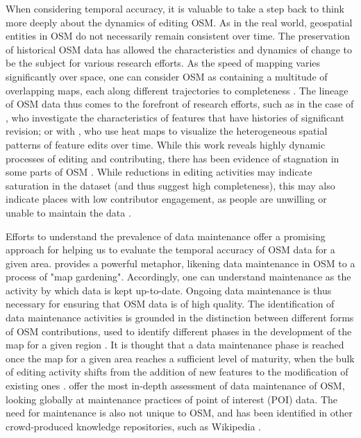 When considering temporal accuracy, it is valuable to take a step back to think more deeply about the dynamics of editing OSM. As in the real world, geospatial entities in OSM do not necessarily remain consistent over time. The preservation of historical OSM data has allowed the characteristics and dynamics of change to be the subject for various research efforts. As the speed of mapping varies significantly over space, one can consider OSM as containing a multitude of overlapping maps, each along different trajectories to completeness \parencite{chuang_one_2013}. The lineage of OSM data thus comes to the forefront of research efforts, such as in the case of \textcite{mooney_characteristics_2012}, who investigate the characteristics of features that have histories of significant revision; or with  \textcite{trame_exploring_2011}, who use heat maps to visualize the heterogeneous spatial patterns of feature edits over time. While this work reveals highly dynamic processes of editing and contributing, there has been evidence of stagnation in some parts of OSM \parencite{grochenig_digging_2014}. While reductions in editing activities may indicate saturation in the dataset (and thus suggest high completeness), this may also indicate places with low contributor engagement, as people are unwilling or unable to maintain the data \parencite{grochenig_digging_2014}.

Efforts to understand the prevalence of data maintenance offer a promising approach for helping us to evaluate the temporal accuracy of OSM data for a given area. \textcite{mcconchie_wiki_2013} provides a powerful metaphor, likening data maintenance in OSM to a process of "map gardening". Accordingly, one can understand maintenance as the activity by which data is kept up-to-date. Ongoing data maintenance is thus necessary for ensuring that OSM data is of high quality. The identification of data maintenance activities is grounded in the distinction between different forms of OSM contributions, used to identify different phases in the development of the map for a given region \parencite{anderson_crowd_2018}. It is thought that a data maintenance phase is reached once the map for a given area reaches a sufficient level of maturity, when the bulk of editing activity shifts from the addition of new features to the modification of existing ones \parencite{anderson_crowd_2018}. \textcite{quattrone_work_2017} offer the most in-depth assessment of data maintenance of OSM, looking globally at maintenance practices of point of interest (POI) data. The need for maintenance is also not unique to OSM, and has been identified in other crowd-produced knowledge repositories, such as Wikipedia \parencite{kittur_he_2007}. 

